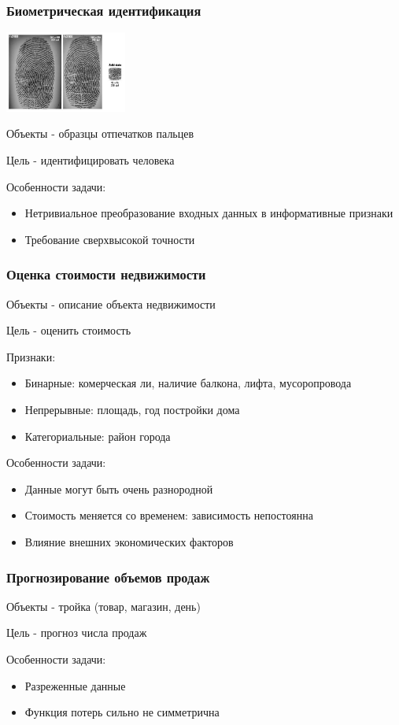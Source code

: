 \documentclass{beamer}
\begin{document}
	
	\begin{frame}
		\frametitle{Биометрическая идентификация}
		
		\begin{center}
			\includegraphics[width=4cm]{img/fingerprint.jpg}	
		\end{center}
		
		Объекты - образцы отпечатков пальцев

		Цель - идентифицировать человека
		
		\vspace{15pt}
		
		Особенности задачи:
		\begin{itemize}
			\item Нетривиальное преобразование входных данных в информативные признаки
			\item Требование сверхвысокой точности
		\end{itemize}			
	\end{frame}


	\begin{frame}
		\frametitle{Оценка стоимости недвижимости}
		Объекты - описание объекта недвижимости
		
		Цель - оценить стоимость
		
		Признаки:
		\begin{itemize}
			\item Бинарные: комерческая ли, наличие балкона, лифта, мусоропровода
			\item Непрерывные: площадь, год постройки дома
			\item Категориальные: район города
		\end{itemize}
		
		Особенности задачи:
		\begin{itemize}
			\item Данные могут быть очень разнородной
			\item Стоимость меняется со временем: зависимость непостоянна
			\item Влияние внешних экономических факторов
		\end{itemize}		
	\end{frame}

	
	\begin{frame}
		\frametitle{Прогнозирование объемов продаж}
		Объекты - тройка (товар, магазин, день)
		
		Цель - прогноз числа продаж
		
		\vspace{15pt}
		
		Особенности задачи:
		\begin{itemize}
			\item Разреженные данные
			\item Функция потерь сильно не симметрична
		\end{itemize}	
	\end{frame}
	
\end{document}
